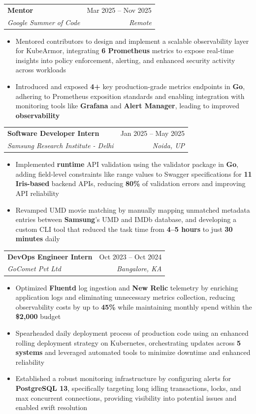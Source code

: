 \documentclass[letterpaper,11pt]{article}
\makeatletter
\newcommand{\resumeItem}[1]{
  \item\small{
    {#1 \vspace{-2pt}}
  }
}
\newcommand{\resumeSubheading}[4]{
  \vspace{-2pt}\item
    \begin{tabular*}{0.97\textwidth}[t]{l@{\extracolsep{\fill}}r}
      \textbf{#1} & #2 \\
      \textit{\small#3} & \textit{\small #4} \\
    \end{tabular*}\vspace{-7pt}
}
\newcommand{\resumeItemListStart}{\begin{itemize}[leftmargin=0.15in]}
\newcommand{\resumeItemListEnd}{\end{itemize}\vspace{-5pt}}
\makeatother
\begin{document}
    \resumeSubheading
      {Mentor}{Mar 2025 -- Nov 2025}
      {Google Summer of Code}{Remote}
      \resumeItemListStart
        \resumeItem{Mentored contributors to design and implement a scalable observability layer for KubeArmor, integrating \textbf{6 Prometheus} metrics to expose real-time insights into policy enforcement, alerting, and enhanced security activity across workloads}
        \resumeItem{Introduced and exposed \textbf{4+} key production-grade metrics endpoints in \textbf{Go}, adhering to Prometheus exposition standards and enabling integration with monitoring tools like \textbf{Grafana} and \textbf{Alert Manager}, leading to improved \textbf{observability}}
      \resumeItemListEnd

    \resumeSubheading
      {Software Developer Intern}{Jan 2025 -- May 2025}
      {Samsung Research Institute - Delhi}{Noida, UP}
      \resumeItemListStart
        \resumeItem{Implemented \textbf{runtime} API validation using the validator package in \textbf{Go}, adding field-level constraints like range values to Swagger specifications for \textbf{11 Iris-based} backend APIs, reducing \textbf{80\%} of validation errors and improving API reliability}
        \resumeItem{Revamped UMD movie matching by manually mapping unmatched metadata entries between \textbf{Samsung}'s UMD and IMDb database, and developing a custom CLI tool that reduced the task time from \textbf{4--5 hours} to just \textbf{30 minutes} daily}
      \resumeItemListEnd

    \resumeSubheading
      {DevOps Engineer Intern}{Oct 2023 -- Oct 2024}
      {GoComet Pvt Ltd}{Bangalore, KA}
      \resumeItemListStart
        \resumeItem{Optimized \textbf{Fluentd} log ingestion and \textbf{New Relic} telemetry by enriching application logs and eliminating unnecessary metrics collection, reducing observability costs by up to \textbf{45\%} while maintaining monthly spend within the \textbf{\$2,000} budget}
        \resumeItem{Spearheaded daily deployment process of production code using an enhanced rolling deployment strategy on Kubernetes, orchestrating updates across \textbf{5 systems} and leveraged automated tools to minimize downtime and enhanced reliability}
        \resumeItem{Established a robust monitoring infrastructure by configuring alerts for \textbf{PostgreSQL 13}, specifically targeting long idling transactions, locks, and max concurrent connections, providing visibility into potential issues and enabled swift resolution}
      \resumeItemListEnd
\end{document}
